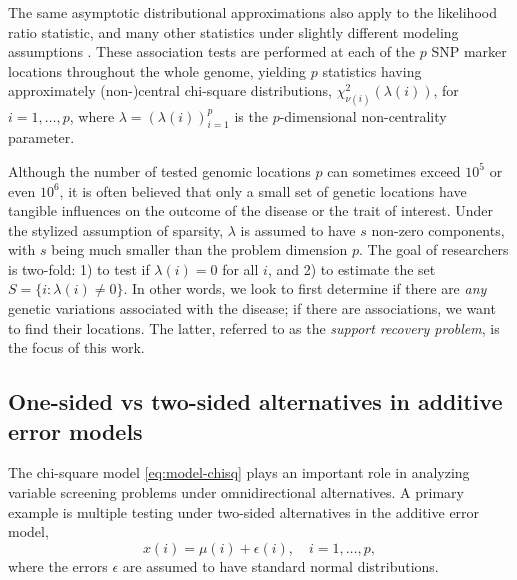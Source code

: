 The same asymptotic distributional approximations also apply to the likelihood ratio statistic, and many other statistics under slightly different modeling assumptions \cite{gao2019upass}.
These association tests are performed at each of the $p$ SNP marker locations throughout the whole genome, yielding $p$ statistics having approximately (non-)central chi-square distributions, $\chi_{\nu(i)}^2\left(\lambda(i)\right)$, for $i=1,\ldots,p$,
where $\lambda = (\lambda(i))_{i=1}^p$ is the $p$-dimensional non-centrality parameter.

Although the number of tested genomic locations $p$ can sometimes exceed $10^5$ or even $10^6$, it is often believed that only a small set of genetic locations have tangible influences on the outcome of the disease or the trait of interest.
Under the stylized assumption of sparsity, $\lambda$ is assumed to have $s$ non-zero components, with $s$ being much smaller than the problem dimension $p$. 
The goal of researchers is two-fold: 1) to test if $\lambda(i)=0$ for all $i$, and 2) to estimate the set $S=\{i:\lambda(i)\neq 0\}$.
In other words, we look to first determine if there are \emph{any} genetic variations associated with the disease; if there are associations, we want to find their locations.
The latter, referred to as the \emph{support recovery problem}, is the focus of this work.

\subsection{One-sided vs two-sided alternatives in additive error models}
\label{subsec:motivation-additive}

The chi-square model \eqref{eq:model-chisq} plays an important role in analyzing variable screening problems under omnidirectional alternatives.
A primary example is multiple testing under two-sided alternatives in the additive error model,
\begin{equation} \label{eq:model-additive}
    x(i) = \mu(i) + \epsilon(i), \quad i=1,\ldots,p,
\end{equation}
where the errors $\epsilon$ are assumed to have standard normal distributions.

